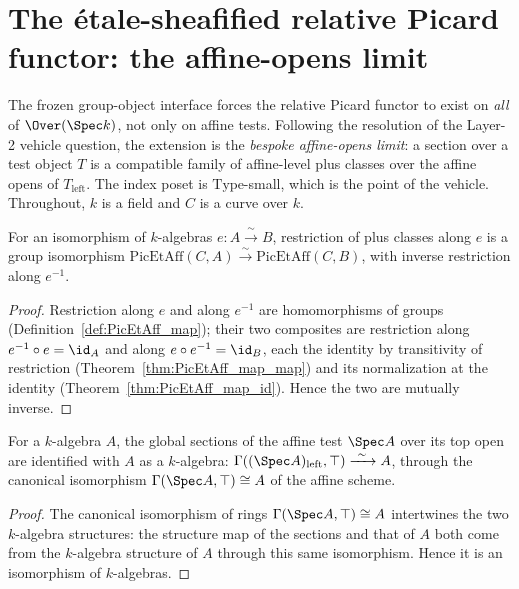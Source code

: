 \section{The \'etale-sheafified relative Picard functor: the affine-opens limit}

The frozen group-object interface forces the relative Picard functor to exist on \emph{all} of
\(\Over(\Spec k)\), not only on affine tests. Following the resolution of the Layer-2 vehicle
question, the extension is the \emph{bespoke affine-opens limit}: a section over a test object
\(T\) is a compatible family of affine-level plus classes over the affine opens of
\(T_{\mathrm{left}}\). The index poset is \(\mathrm{Type}\)-small, which is the point of the
vehicle. Throughout, \(k\) is a field and \(C\) is a curve over \(k\).

\begin{definition}
  \label{def:PicEtAff_congr}
  \leanok
  For an isomorphism of \(k\)-algebras \(e \colon A \xrightarrow{\ \sim\ } B\), restriction of plus
  classes along \(e\) is a group isomorphism \(\mathrm{PicEtAff}(C, A) \xrightarrow{\ \sim\ }
  \mathrm{PicEtAff}(C, B)\), with inverse restriction along \(e^{-1}\).
\end{definition}
\begin{proof}
  \leanok
  Restriction along \(e\) and along \(e^{-1}\) are homomorphisms of groups
  (Definition~\ref{def:PicEtAff_map}); their two composites are restriction along
  \(e^{-1} \circ e = \id_A\) and along \(e \circ e^{-1} = \id_B\), each the identity by transitivity
  of restriction (Theorem~\ref{thm:PicEtAff_map_map}) and its normalization at the identity
  (Theorem~\ref{thm:PicEtAff_map_id}). Hence the two are mutually inverse.
\end{proof}

\begin{definition}
  \label{def:overSpecGammaTop}
  \leanok
  For a \(k\)-algebra \(A\), the global sections of the affine test \(\Spec A\) over its top open
  are identified with \(A\) as a \(k\)-algebra: \(\Gamma((\Spec A)_{\mathrm{left}}, \top)
  \xrightarrow{\ \sim\ } A\), through the canonical isomorphism \(\Gamma(\Spec A, \top) \cong A\) of
  the affine scheme.
\end{definition}
\begin{proof}
  \leanok
  The canonical isomorphism of rings \(\Gamma(\Spec A, \top) \cong A\) intertwines the two
  \(k\)-algebra structures: the structure map of the sections and that of \(A\) both come from the
  \(k\)-algebra structure of \(A\) through this same isomorphism. Hence it is an isomorphism of
  \(k\)-algebras.
\end{proof}

